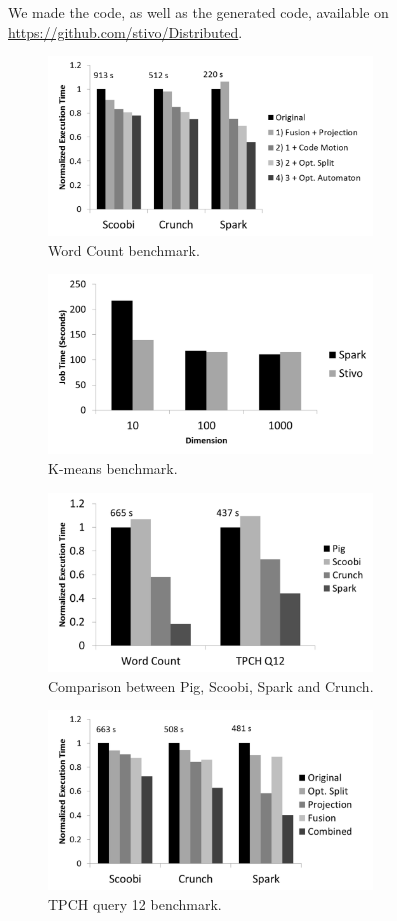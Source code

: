 We made the \tool code, as well as the generated code, available on \url{https://github.com/stivo/Distributed}.

\begin{figure}[ht]
    \includegraphics[width=8.6cm]{figures/word-count}
   \caption{Word Count benchmark.}
   \label{fig:word-count}%
\end{figure}
\begin{figure}[ht]
    \includegraphics[width=8.6cm]{figures/k-means}
   \caption{K-means benchmark.}
   \label{fig:k-means}%
\end{figure}

\begin{figure}[ht]
    \includegraphics[width=8.6cm]{figures/pig}
   \caption{Comparison between Pig, Scoobi, Spark and Crunch.}
   \label{fig:pig}%
\end{figure}

\begin{figure}[ht]
    \includegraphics[width=8.6cm]{figures/tpch}

   \caption{TPCH query 12 benchmark.}
  \label{fig:tpch}%
\end{figure}

